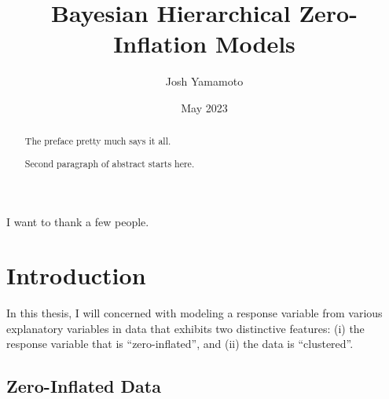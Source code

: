 \documentclass[12pt,twoside]{reedthesis}
\title{Bayesian Hierarchical Zero-Inflation Models}
\author{Josh Yamamoto}
\date{May 2023}
\begin{document}
  \maketitle

\frontmatter %
\pagestyle{empty} %
  \begin{acknowledgements}
    I want to thank a few people.
  \end{acknowledgements}


  \hypersetup{linkcolor=black}
  \setcounter{secnumdepth}{2}
  \setcounter{tocdepth}{2}
  \tableofcontents

  \listoftables

  \listoffigures
  \begin{abstract}
    The preface pretty much says it all.

    \par

    Second paragraph of abstract starts here.
  \end{abstract}

\mainmatter %
\pagestyle{fancyplain} %

\hypertarget{intro-section}{%
\chapter{Introduction}\label{intro-section}}

In this thesis, I will concerned with modeling a response variable from various explanatory variables in data that exhibits two distinctive features: (i) the response variable that is ``zero-inflated'', and (ii) the data is ``clustered''.

\hypertarget{zero-inflated-data}{%
\section{Zero-Inflated Data}\label{zero-inflated-data}}
\end{document}
